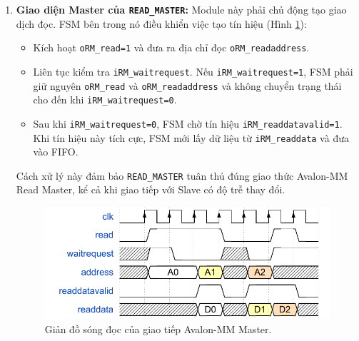 \begin{enumerate}
    \item \textbf{Giao diện Master của \texttt{READ\_MASTER}:} Module này phải chủ động tạo giao dịch đọc. FSM bên trong nó điều khiển việc tạo tín hiệu (Hình \ref{fig:02_05_avalon_master_read}):
        \begin{itemize}
            \item Kích hoạt \texttt{oRM\_read=1} và đưa ra địa chỉ đọc \texttt{oRM\_readaddress}.
            \item Liên tục kiểm tra \texttt{iRM\_waitrequest}. Nếu \texttt{iRM\_waitrequest=1}, FSM phải giữ nguyên \texttt{oRM\_read} và \texttt{oRM\_readaddress} và không chuyển trạng thái cho đến khi \texttt{iRM\_waitrequest=0}.
            \item Sau khi \texttt{iRM\_waitrequest=0}, FSM chờ tín hiệu \texttt{iRM\_readdatavalid=1}. Khi tín hiệu này tích cực, FSM mới lấy dữ liệu từ \texttt{iRM\_readdata} và đưa vào FIFO.
        \end{itemize}
        Cách xử lý này đảm bảo \texttt{READ\_MASTER} tuân thủ đúng giao thức Avalon-MM Read Master, kể cả khi giao tiếp với Slave có độ trễ thay đổi.

    \begin{figure}[htbp]
        \centering
        \includegraphics[width=\linewidth]{Images/02_05_AvalonMaster_ReadWaveform.pdf}
        \caption{Giản đồ sóng đọc của giao tiếp Avalon-MM Master.}
        \label{fig:02_05_avalon_master_read}
    \end{figure}


\end{enumerate}
